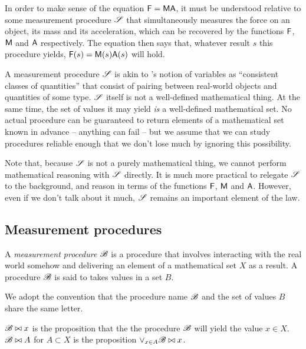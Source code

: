 In order to make sense of the equation $\mathsf{F}=\mathsf{MA}$, it must be understood relative to some measurement procedure $\mathscr{S}$ that simultaneously measures the force on an object, its mass and its acceleration, which can be recovered by the functions $\mathsf{F}$, $\mathsf{M}$ and $\mathsf{A}$ respectively. The equation then says that, whatever result $s$ this procedure yields, $\mathsf{F}(s)=\mathsf{M}(s)\mathsf{A}(s)$ will hold.

A measurement procedure $\mathscr{S}$ is akin to \citet{menger_random_2003}'s notion of variables as ``consistent classes of quantities'' that consist of pairing between real-world objects and quantities of some type. $\mathscr{S}$ itself is not a well-defined mathematical thing. At the same time, the set of values it may yield \emph{is} a well-defined mathematical set. No actual procedure can be guaranteed to return elements of a mathematical set known in advance -- anything can fail -- but we assume that we can study procedures reliable enough that we don't lose much by ignoring this possibility.

Note that, because $\mathscr{S}$ is not a purely mathematical thing, we cannot perform mathematical reasoning with $\mathscr{S}$ directly. It is much more practical to relegate $\mathscr{S}$ to the background, and reason in terms of the functions $\mathsf{F}$, $\mathsf{M}$ and $\mathsf{A}$. However, even if we don't talk about it much, $\mathscr{S}$ remains an important element of the law.

\subsection{Measurement procedures}\label{sec:mprocs}

\begin{definition}
A \emph{measurement procedure} $\mathscr{B}$ is a procedure that involves interacting with the real world somehow and delivering an element of a mathematical set $X$ as a result. A procedure $\mathscr{B}$ is said to takes values in a set $B$.
\end{definition}

We adopt the convention that the procedure name $\mathscr{B}$ and the set of values $B$ share the same letter.

\begin{definition}
$\mathscr{B}\bowtie x$ is the proposition that the the procedure $\mathscr{B}$ will yield the value $x\in X$. $\mathscr{B}\bowtie A$ for $A\subset X$ is the proposition $\lor_{x\in A} \mathscr{B}\bowtie x$.
\end{definition}

